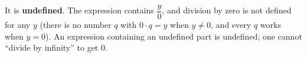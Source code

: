 It is \textbf{undefined}. The expression contains $\dfrac {y}{0}$, and division by zero is not defined for any $y$ (there is no number $q$ with $0\cdot q=y$ when $y\ne0$, and every $q$ works when $y=0$). An expression containing an undefined part is undefined; one cannot ``divide by infinity'' to get $0$.
